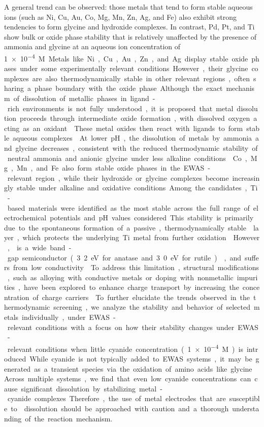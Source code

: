 \documentclass[journal=jacsat,manuscript=article]{achemso}
\begin{document}
A general trend can be observed: those metals that tend to form stable aqueous ions (such as Ni, Cu, Au, Co, Mg, Mn, Zn, Ag, and Fe) also exhibit strong tendencies to form glycine and hydroxide complexes. In contrast, Pd, Pt, and Ti show bulk or oxide phase stability that is relatively unaffected by the presence of ammonia and glycine at an aqueous ion concentration of \SI{1e-4}M.

Metals like Ni, Cu, Au, Zn, and Ag display stable oxide phases under some experimentally relevant conditions. However, their glycine complexes are also thermodynamically stable in other relevant regions, often sharing a phase boundary with the oxide phase. Although the exact mechanism of dissolution of metallic phases in ligand-rich environments is not fully understood, it is proposed that metal dissolution proceeds through intermediate oxide formation, with dissolved oxygen acting as an oxidant \cite{Liao2012EffectsCopper, Ihnfeldt2008EffectNanohardness}. These metal oxides then react with ligands to form stable aqueous complexes \cite{Broeksma2023EvaluatingBoards, Du2004EffectIons, Ihnfeldt2008EffectNanohardness}. At lower pH, the dissolution of metals by ammonia and glycine decreases, consistent with the reduced thermodynamic stability of neutral ammonia and anionic glycine under less alkaline conditions \cite{Broeksma2023EvaluatingBoards}. Co, Mg, Mn, and Fe also form stable oxide phases in the EWAS-relevant region, while their hydroxide or glycine complexes become increasingly stable under alkaline and oxidative conditions.

Among the candidates, Ti-based materials were identified as the most stable across the full range of electrochemical potentials and pH values considered. This stability is primarily due to the spontaneous formation of a passive, thermodynamically stable  layer, which protects the underlying Ti metal from further oxidation \cite{Kuromoto2007TitaniumVoltages}. However,  is a wide band-gap semiconductor (3.2 eV for anatase and 3.0 eV for rutile) \cite{Earle1942TheDioxide, Bendavid1999StructuralDeposition}, and suffers from low conductivity \cite{Wu2014High-performanceApproach}. To address this limitation, structural modifications, such as alloying with conductive metals or doping with nonmetallic impurities, have been explored to enhance charge transport by increasing the concentration of charge carriers \cite{Zheng2011FacilePhenol, Hahn2009SemimetallicNanotubes}.

To further elucidate the trends observed in the thermodynamic screening, we analyze the stability and behavior of selected metals individually, under EWAS-relevant conditions with a focus on how their stability changes under EWAS-relevant conditions when little cyanide concentration (\SI{1e-4}M) is introduced. While cyanide is not typically added to EWAS systems, it may be generated as a transient species via the oxidation of amino acids like glycine. Across multiple systems, we find that even low cyanide concentrations can cause significant dissolution by stabilizing metal-cyanide complexes. Therefore, the use of metal electrodes that are susceptible to  dissolution should be approached with caution and a thorough understanding of the reaction mechanism.
\end{document}
